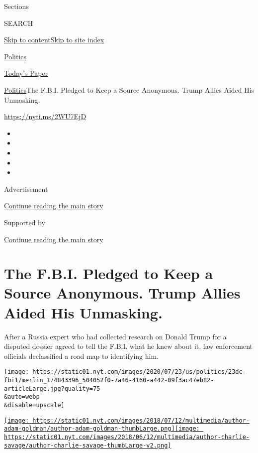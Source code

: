 Sections

SEARCH

\protect\hyperlink{site-content}{Skip to
content}\protect\hyperlink{site-index}{Skip to site index}

\href{https://www.nytimes.com/section/politics}{Politics}

\href{https://myaccount.nytimes.com/auth/login?response_type=cookie\&client_id=vi}{}

\href{https://www.nytimes.com/section/todayspaper}{Today's Paper}

\href{/section/politics}{Politics}\textbar{}The F.B.I. Pledged to Keep a
Source Anonymous. Trump Allies Aided His Unmasking.

\url{https://nyti.ms/2WU7EjD}

\begin{itemize}
\item
\item
\item
\item
\item
\end{itemize}

Advertisement

\protect\hyperlink{after-top}{Continue reading the main story}

Supported by

\protect\hyperlink{after-sponsor}{Continue reading the main story}

\hypertarget{the-fbi-pledged-to-keep-a-source-anonymous-trump-allies-aided-his-unmasking}{%
\section{The F.B.I. Pledged to Keep a Source Anonymous. Trump Allies
Aided His
Unmasking.}\label{the-fbi-pledged-to-keep-a-source-anonymous-trump-allies-aided-his-unmasking}}

After a Russia expert who had collected research on Donald Trump for a
disputed dossier agreed to tell the F.B.I. what he knew about it, law
enforcement officials declassified a road map to identifying him.

\texttt{[image: https://static01.nyt.com/images/2020/07/23/us/politics/23dc-fbi1/merlin\_174843396\_504052f0-7a46-4160-a442-09f3ac47eb82-articleLarge.jpg?quality=75\\\&auto=webp\\\&disable=upscale]}

\href{https://www.nytimes.com/by/adam-goldman}{\texttt{[image: https://static01.nyt.com/images/2018/07/12/multimedia/author-adam-goldman/author-adam-goldman-thumbLarge.png]}}\href{https://www.nytimes.com/by/charlie-savage}{\texttt{[image: https://static01.nyt.com/images/2018/06/12/multimedia/author-charlie-savage/author-charlie-savage-thumbLarge-v2.png]}}

